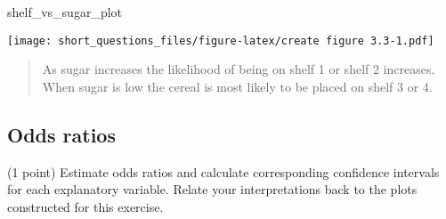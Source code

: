 \documentclass[
  11pt,
]{article}
\newenvironment{Shaded}{\begin{snugshade}}{\end{snugshade}}
\newcommand{\NormalTok}[1]{#1}
\begin{document}
\begin{Shaded}
\begin{Highlighting}[]
\NormalTok{shelf\_vs\_sugar\_plot}
\end{Highlighting}
\end{Shaded}

\texttt{[image: short\_questions\_files/figure-latex/create figure 3.3-1.pdf]}

\begin{quote}
As sugar increases the likelihood of being on shelf 1 or shelf 2
increases. When sugar is low the cereal is most likely to be placed on
shelf 3 or 4.
\end{quote}

\hypertarget{odds-ratios}{%
\subsection{Odds ratios}\label{odds-ratios}}

(1 point) Estimate odds ratios and calculate corresponding confidence
intervals for each explanatory variable. Relate your interpretations
back to the plots constructed for this exercise.
\end{document}
